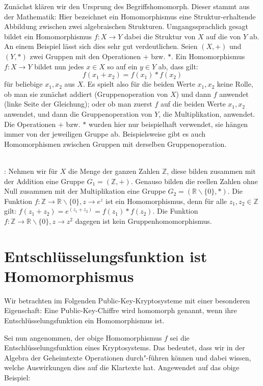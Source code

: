 \begin{refsegment}
Zunächst klären wir den Ursprung des Begriffs\glqq homomorph\grqq. Dieser stammt aus der Mathematik: Hier bezeichnet ein Homomorphismus eine Struktur-erhaltende Abbildung zwischen zwei algebraischen Strukturen. Umgangssprachlich gesagt bildet ein Homomorphismus $f: X \to Y$ dabei die Struktur von $X$ auf die von $Y$ ab. An einem Beispiel lässt sich dies sehr gut verdeutlichen. Seien $(X,+)$ und $(Y,*)$ zwei Gruppen mit den Operationen $+$ bzw. $*$. Ein Homomorphismus $f: X \to Y$ bildet nun jedes $x \in X$ so auf ein $y \in Y$ ab, dass gilt:
$$f(x_1 + x_2) = f(x_1) * f(x_2)$$
für beliebige $x_1, x_2$ aus $X$. Es spielt also für die beiden Werte $x_1, x_2$ keine Rolle, ob man sie zunächst addiert (Gruppenoperation von $X$) und dann $f$ anwendet (linke Seite der Gleichung); oder ob man zuerst  $f$ auf die beiden Werte $x_1, x_2$ anwendet, und dann die Gruppenoperation von $Y$, die Multiplikation, anwendet. Die Operationen $+$ bzw. $*$ wurden hier nur beispielhaft verwendet, sie hängen immer von der jeweiligen Gruppe ab. Beispielsweise gibt es auch Homomorphismen zwischen Gruppen mit derselben Gruppenoperation.
\\\\
\begin{example}{:} Nehmen wir für $X$ die Menge der ganzen Zahlen $\mathbb{Z}$, diese bilden zusammen mit der Addition eine Gruppe $G_1 = (\mathbb{Z}, +)$. Genauso bilden die reellen Zahlen ohne Null zusammen mit der Multiplikation eine Gruppe $G_2 = (\mathbb{R}\backslash\{0\}, *)$. Die Funktion $f:\mathbb{Z} \to \mathbb{R}\backslash\{0\},z \to e^z$ ist ein Homomorphismus, denn für alle $z_1,z_2 \in \mathbb{Z}$ gilt: $f(z_1+ z_2) = e^{(z_1+ z_2 )}=f(z_1 )* f(z_2)$. Die Funktion $f:\mathbb{Z} \to \mathbb{R}\backslash\{0\}, z \to z^2$ dagegen ist kein Gruppenhomomorphismus.
\end{example}

\section{Entschlüsselungsfunktion ist Homomorphismus}

Wir betrachten im Folgenden Public-Key-Kryptosysteme mit einer besonderen Eigenschaft: Eine Public-Key-Chiffre wird homomorph genannt, wenn ihre Entschlüsselungsfunktion ein Homomorphismus ist.

Sei nun angenommen, der obige Homomorphismus $f$ sei die Entschlüsselungsfunktion eines Kryptosystems. Das bedeutet, dass wir in der Algebra der Geheimtexte Operationen durch"-führen können und dabei wissen, welche Auswirkungen dies auf die Klartexte hat. Angewendet auf das obige Beispiel:


\end{refsegment}
